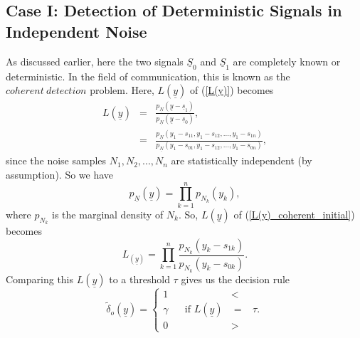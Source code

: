 \documentclass[a4paper,english,12pt]{article}
\begin{document}
\subsection{Case I: Detection of Deterministic Signals in Independent Noise}
As discussed earlier, here the two signals $\underline{S}_{0}$ and $\underline{S}_{1}$ are completely known or deterministic. In the field of communication, this is known as the $coherent\ detection$ problem. Here, $L(\underline{y})$ of (\ref{L(y)}) becomes
\begin{eqnarray}
\label{L(y)_coherent_initial}
L (\underline{y})&=&\frac{p_{\underline{N}}(\underline{y}-\underline{s}_{1})}{p_{\underline{N}}(\underline{y}-\underline{s}_{0})},\nonumber\\
&=&\frac{p_{\underline{N}}(y_{1}-s_{11},y_{1}-s_{12},...,y_{1}-s_{1n})} {p_{\underline{N}}(y_{1}-s_{01},y_{1}-s_{12},...,y_{1}-s_{0n})},
\end{eqnarray}
since the noise samples $N_{1},N_{2},...,N_{n}$ are statistically independent (by assumption). So we have
\begin{equation}
p_{\underline{N}}(\underline{y})= \prod_{k=1}^{n}   p_{N_{k}}(y_{k}),
\end{equation}
where $p_{N_{k}}$ is the marginal density of $N_{k}$. So, $L({\underline{y}})$ of (\ref{L(y)_coherent_initial}) becomes  
\begin{equation}
\label{L(y)_Coherent}
L_(\underline{y})= \prod_{k=1}^{n}\frac{p_{N_{k}}(y_{k}-s_{1k})}{p_{N_{k}}(y_{k}-s_{0k})}.
\end{equation}
Comparing this $L(\underline{y})$ to a threshold $\tau$ gives us the decision rule
\begin{equation}
\tilde\delta_{o}(\underline{y})=\begin{cases} 
1 &<\\
\gamma \hspace{20pt}\text{if } L(\underline{y}) &= \hspace{10pt}\tau.\\
0 &>
\end{cases}
\end{equation}
\end{document}

